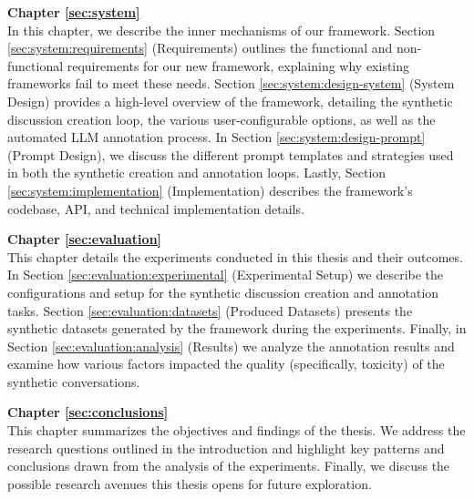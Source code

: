 \textbf{Chapter \ref{sec:system}} \\[0.2em]

In this chapter, we describe the inner mechanisms of our framework. Section \ref{sec:system:requirements} (Requirements) outlines the functional and non-functional requirements for our new framework, explaining why existing frameworks fail to meet these needs. Section \ref{sec:system:design-system} (System Design) provides a high-level overview of the framework, detailing the synthetic discussion creation loop, the various user-configurable options, as well as the automated LLM annotation process. In Section \ref{sec:system:design-prompt} (Prompt Design), we discuss the different prompt templates and strategies used in both the synthetic creation and annotation loops. Lastly, Section \ref{sec:system:implementation} (Implementation) describes the framework's codebase, \ac{API}, and technical implementation details.

\textbf{Chapter \ref{sec:evaluation}} \\[0.2em]

This chapter details the experiments conducted in this thesis and their outcomes. In Section \ref{sec:evaluation:experimental} (Experimental Setup) we describe the configurations and setup for the synthetic discussion creation and annotation tasks. Section \ref{sec:evaluation:datasets} (Produced Datasets)  presents the synthetic datasets generated by the framework during the experiments.  Finally, in Section \ref{sec:evaluation:analysis} (Results) we analyze the annotation results and examine how various factors impacted the quality (specifically, toxicity) of the synthetic conversations.


\textbf{Chapter \ref{sec:conclusions}} \\[0.2em]

This chapter summarizes the objectives and findings of the thesis. We address the research questions outlined in the introduction and highlight key patterns and conclusions drawn from the analysis of the experiments. Finally, we discuss the possible research avenues this thesis opens for future exploration.




